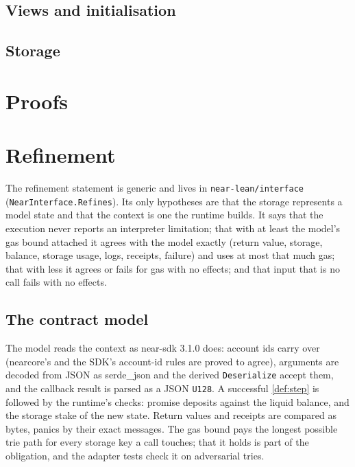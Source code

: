 
\section{Views and initialisation}


\section{Storage}


\chapter{Proofs}
\label{ch:proofs}


\chapter{Refinement}
\label{ch:refinement}

The refinement statement is generic and lives in \texttt{near-lean/interface}
(\texttt{NearInterface.Refines}). Its only hypotheses are that the storage
represents a model state and that the context is one the runtime builds. It
says that the execution never reports an interpreter limitation; that with at
least the model's gas bound attached it agrees with the model exactly (return
value, storage, balance, storage usage, logs, receipts, failure) and uses at
most that much gas; that with less it agrees or fails for gas with no effects;
and that input that is no call fails with no effects.

\section{The contract model}

The model reads the context as near-sdk 3.1.0 does: account ids carry over
(nearcore's and the SDK's account-id rules are proved to agree), arguments
are decoded from JSON as serde\_json and the derived \texttt{Deserialize}
accept them, and the callback result is parsed as a JSON \texttt{U128}. A
successful \cref{def:step} is followed by the runtime's checks: promise
deposits against the liquid balance, and the storage stake of the new state.
Return values and receipts are compared as bytes, panics by their exact
messages. The gas bound pays the longest possible trie path for every storage
key a call touches; that it holds is part of the obligation, and the adapter
tests check it on adversarial tries.

